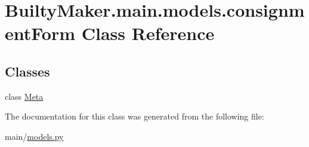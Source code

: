 \hypertarget{classBuiltyMaker_1_1main_1_1models_1_1consignmentForm}{\section{\-Builty\-Maker.\-main.\-models.\-consignment\-Form \-Class \-Reference}
\label{classBuiltyMaker_1_1main_1_1models_1_1consignmentForm}
}
\subsection*{\-Classes}
\begin{DoxyCompactItemize}
\item 
class \hyperlink{classBuiltyMaker_1_1main_1_1models_1_1consignmentForm_1_1Meta}{\-Meta}
\end{DoxyCompactItemize}


\-The documentation for this class was generated from the following file\-:\begin{DoxyCompactItemize}
\item 
main/\hyperlink{models_8py}{models.\-py}\end{DoxyCompactItemize}
